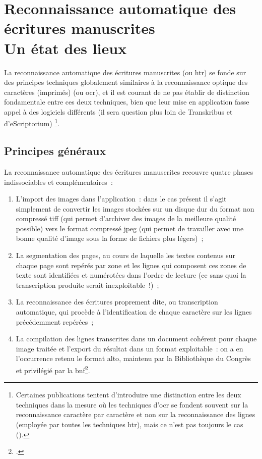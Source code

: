 \documentclass[a4paper,12pt,twoside]{book}
\begin{document}
	\chapter[HTR~: état des lieux]{Reconnaissance automatique des écritures manuscrites \\ \large Un état des lieux}
		
		La reconnaissance automatique des écritures manuscrites (ou \gls{htr}) se fonde sur des principes techniques globalement similaires à la reconnaissance optique des caractères (imprimés) (ou \gls{ocr}), et il est courant de ne pas établir de distinction fondamentale entre ces deux techniques, bien que leur mise en application fasse appel à des logiciels différents (il sera question plus loin de Transkribus et d'eScriptorium)
		\footnote{Certaines publications tentent d'introduire une distinction entre les deux techniques dans la mesure où les techniques d'\gls{ocr} se fondent souvent sur la reconnaissance caractère par caractère et non sur la reconnaissance des lignes (employée par toutes les techniques \gls{htr}), mais ce n'est pas toujours le cas (\cite{stokesEScriptoriumVREManuscript2021}).}.
		
		\section{Principes généraux}
		
			La reconnaissance automatique des écritures manuscrites recouvre quatre phases indissociables et complémentaires~:
			
			\begin{enumerate}
				\item L'import des images dans l'application~: dans le cas présent il s'agit simplement de convertir les images stockées sur un disque dur du format non compressé \textsf{tiff} (qui permet d'archiver des images de la meilleure qualité possible) vers le format compressé \textsf{jpeg} (qui permet de travailler avec une bonne qualité d'image sous la forme de fichiers plus légers)~;
				\item La \gls{segmentation} des pages, au cours de laquelle les textes contenus sur chaque page sont repérés par zone et les lignes qui composent ces zones de texte sont identifiées et numérotées dans l'ordre de lecture (ce sans quoi la transcription produite serait inexploitable~!)~;
				\item La reconnaissance des écritures proprement dite, ou transcription automatique, qui procède à l'identification de chaque caractère sur les lignes précédemment repérées~;
				\item La compilation des lignes transcrites dans un document cohérent pour chaque image traitée et l'export du résultat dans un format exploitable~: on a en l'occurrence retenu le format \gls{alto}, maintenu par la Bibliothèque du Congrès et privilégié par la \gls{bnf}\footcite{TechniquesFormatsConversion2022, stokesEScriptoriumVREManuscript2021}.
			\end{enumerate}
			
\end{document}
